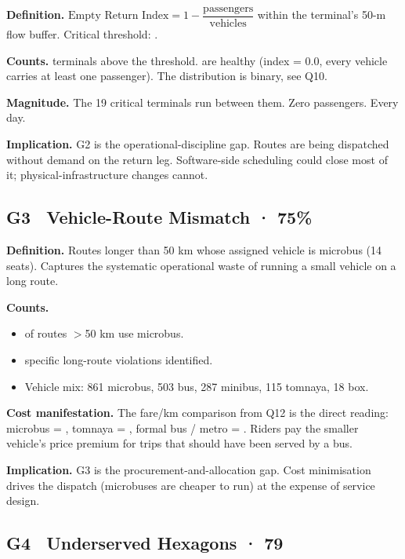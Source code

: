 \textbf{Definition.}
$\text{Empty Return Index} = 1 - \dfrac{\text{passengers}}{\text{vehicles}}$ within the terminal's 50-m flow buffer.
Critical threshold: .

\textbf{Counts.}  terminals above the threshold.  are healthy
(index = 0.0, every vehicle carries at least one passenger). The
distribution is  binary, see Q10.

\textbf{Magnitude.} The 19 critical terminals run  between them. Zero passengers. Every day.

\textbf{Implication.} G2 is the operational-discipline gap. Routes are
being dispatched without demand on the return leg. Software-side
scheduling could close most of it; physical-infrastructure changes
cannot.

\subsection{G3 \textbullet\ Vehicle-Route Mismatch · 75\%}

\textbf{Definition.} Routes longer than 50 km whose assigned vehicle is
microbus (14 seats). Captures the systematic operational waste of
running a small vehicle on a long route.

\textbf{Counts.}
\begin{itemize}
 \item {} of routes $>$50 km use microbus.
 \item {} specific long-route violations identified.
 \item Vehicle mix: 861 microbus, 503 bus, 287 minibus, 115 tomnaya, 18 box.
\end{itemize}

\textbf{Cost manifestation.} The fare/km comparison from Q12 is the
direct reading: microbus = , tomnaya = ,
formal bus / metro = . Riders pay the smaller
vehicle's price premium for trips that should have been served by a bus.

\textbf{Implication.} G3 is the procurement-and-allocation gap. Cost
minimisation drives the dispatch (microbuses are cheaper to run) at
the expense of service design.

\subsection{G4 \textbullet\ Underserved Hexagons · 79}

